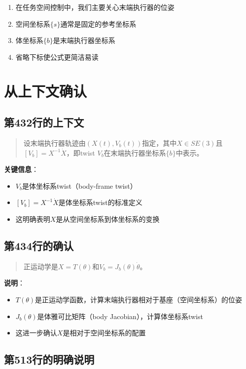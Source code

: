 \documentclass{article}
\begin{document}
\begin{enumerate}
\item 在任务空间控制中，我们主要关心末端执行器的位姿
\item 空间坐标系$\{s\}$通常是固定的参考坐标系
\item 体坐标系$\{b\}$是末端执行器坐标系
\item 省略下标使公式更简洁易读
\end{enumerate}

\section{从上下文确认}

\subsection{第432行的上下文}

\begin{quote}
设末端执行器轨迹由$(X(t), V_b(t))$指定，其中$X \in SE(3)$且$[V_b] = X^{-1}\dot{X}$，即twist $V_b$在末端执行器坐标系$\{b\}$中表示。
\end{quote}

\textbf{关键信息}：
\begin{itemize}
\item $V_b$是体坐标系twist（body-frame twist）
\item $[V_b] = X^{-1}\dot{X}$是体坐标系twist的标准定义
\item 这明确表明$X$是从空间坐标系到体坐标系的变换
\end{itemize}

\subsection{第434行的确认}

\begin{quote}
正运动学是$X = T(\theta)$和$V_b = J_b(\theta)\dot{\theta}$。
\end{quote}

\textbf{说明}：
\begin{itemize}
\item $T(\theta)$是正运动学函数，计算末端执行器相对于基座（空间坐标系）的位姿
\item $J_b(\theta)$是体雅可比矩阵（body Jacobian），计算体坐标系twist
\item 这进一步确认$X$是相对于空间坐标系的配置
\end{itemize}

\subsection{第513行的明确说明}
\end{document}
